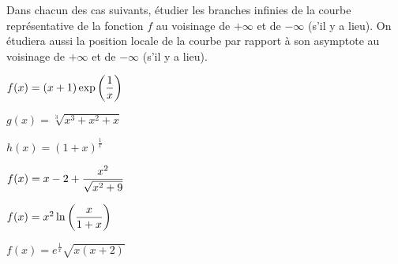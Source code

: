\documentclass[a4paper, 11pt,reqno]{article}
\begin{document}
\begin{exercice}   \;
	Dans chacun des cas suivants, \'etudier les branches infinies de la courbe repr\'esentative de la fonction $f$ au voisinage de $+\infty$ et de $-\infty$ (s'il y a lieu). On \'etudiera aussi la position locale de la courbe par rapport \`a son asymptote au voisinage de $+\infty$ et de $-\infty$ (s'il y a lieu).
	\begin{enumerate}
		\begin{minipage}[t]{0.45\textwidth}
			\item $f(x)=(x+1)\exp{\left( \displaystyle\frac{1}{x} \right)}$
			\item $g(x)=\sqrt[3]{x^3+x^2+x}$
			\item $h(x)=(1+x)^{\frac{1}{x}}$
		\end{minipage}
		\begin{minipage}[t]{0.45\textwidth}
			\item $f(x)=x-2+\displaystyle\frac{x^2}{\sqrt{x^2+9}}$
			\item $f(x)=x^2\ln{\left( \displaystyle\frac{x}{1+x} \right)}$
			\item $f(x)=e^{\frac{1}{x}}\sqrt{x(x+2)}$
		\end{minipage}
	\end{enumerate}
\end{exercice}
\end{document}
